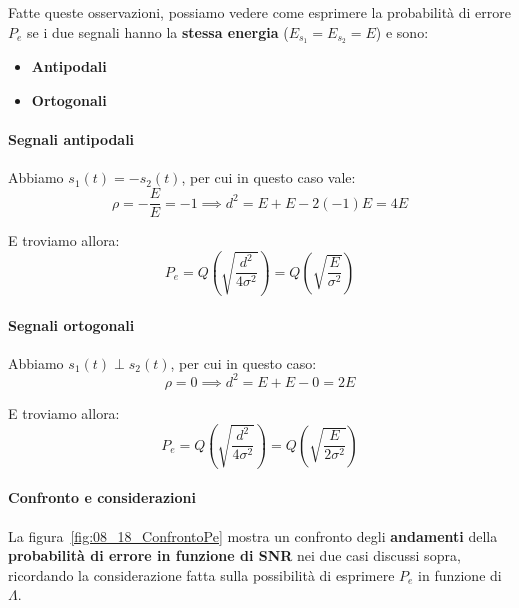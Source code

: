 Fatte queste osservazioni, possiamo vedere come esprimere la probabilità di errore $P_e$ 
se i due segnali hanno la \textbf{stessa energia} ($E_{s_{1}} = E_{s_{2}} = E$) e sono:
\begin{itemize}
    \item \textbf{Antipodali}
    \item \textbf{Ortogonali}
\end{itemize}

\paragraph{Segnali antipodali}
Abbiamo $s_{1}(t) = -s_{2}(t)$, per cui in questo caso vale:
\[
    \rho = -\frac{E}{E} = -1 \implies d^2 = E + E -2(-1)E = 4E
\]

E troviamo allora:
\[
    P_e = Q \left( \sqrt{\frac{d^2}{4 \sigma^2}} \right) = Q \left( \sqrt{\frac{E}{\sigma^2}} \right)
\]

\paragraph{Segnali ortogonali}
Abbiamo $s_{1}(t) \perp s_{2}(t)$, per cui in questo caso:
\[
    \rho = 0 \implies d^2 = E + E -0 = 2E
\]

E troviamo allora:
\[
    P_e = Q \left( \sqrt{\frac{d^2}{4 \sigma^2}} \right) = Q \left( \sqrt{\frac{E}{2\sigma^2}} \right)
\]

\paragraph{Confronto e considerazioni}
La figura~\ref{fig:08_18_ConfrontoPe} mostra un confronto degli \textbf{andamenti}
della \textbf{probabilità di errore in funzione di SNR} nei due casi discussi sopra,
ricordando la considerazione fatta sulla possibilità di esprimere $P_e$ in
funzione di $\Lambda $.

